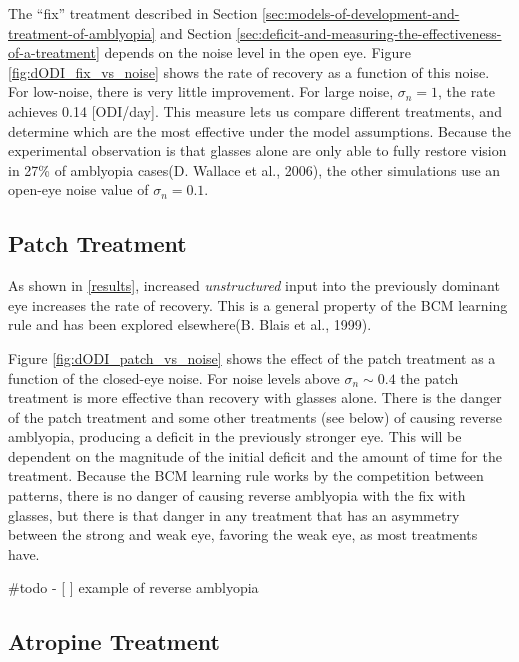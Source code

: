 \documentclass[
  onecolumn]{article}
\begin{document}
The ``fix'' treatment described in Section
\ref{sec:models-of-development-and-treatment-of-amblyopia} and Section
\ref{sec:deficit-and-measuring-the-effectiveness-of-a-treatment} depends
on the noise level in the open eye. Figure \ref{fig:dODI_fix_vs_noise}
shows the rate of recovery as a function of this noise. For low-noise,
there is very little improvement. For large noise, \(\sigma_n=1\), the
rate achieves 0.14 {[}ODI/day{]}. This measure lets us compare different
treatments, and determine which are the most effective under the model
assumptions. Because the experimental observation is that glasses alone
are only able to fully restore vision in 27\% of amblyopia cases(D.
Wallace et al., 2006), the other simulations use an open-eye noise value
of \(\sigma_n=0.1\).

\hypertarget{patch-treatment-1}{%
\subsection{Patch Treatment}\label{patch-treatment-1}}

As shown in \ref{results}, increased \emph{unstructured} input into the
previously dominant eye increases the rate of recovery. This is a
general property of the BCM learning rule and has been explored
elsewhere(B. Blais et al., 1999).

Figure \ref{fig:dODI_patch_vs_noise} shows the effect of the patch
treatment as a function of the closed-eye noise. For noise levels above
\(\sigma_n \sim 0.4\) the patch treatment is more effective than
recovery with glasses alone. There is the danger of the patch treatment
and some other treatments (see below) of causing reverse amblyopia,
producing a deficit in the previously stronger eye. This will be
dependent on the magnitude of the initial deficit and the amount of time
for the treatment. Because the BCM learning rule works by the
competition between patterns, there is no danger of causing reverse
amblyopia with the fix with glasses, but there is that danger in any
treatment that has an asymmetry between the strong and weak eye,
favoring the weak eye, as most treatments have.

\#todo - {[} {]} example of reverse amblyopia

\hypertarget{atropine-treatment-1}{%
\subsection{Atropine Treatment}\label{atropine-treatment-1}}
\end{document}

